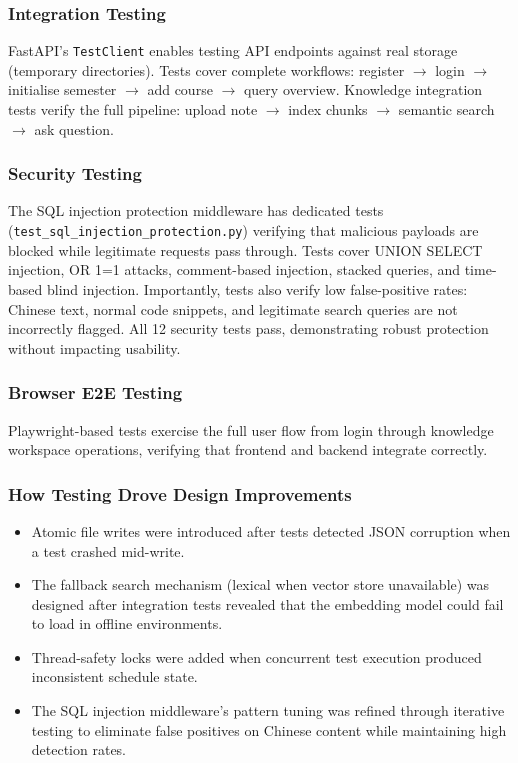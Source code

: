 \documentclass[11pt,a4paper]{article}
\begin{document}
\subsubsection{Integration Testing}
FastAPI's \texttt{TestClient} enables testing API endpoints against real storage (temporary directories). Tests cover complete workflows: register $\rightarrow$ login $\rightarrow$ initialise semester $\rightarrow$ add course $\rightarrow$ query overview. Knowledge integration tests verify the full pipeline: upload note $\rightarrow$ index chunks $\rightarrow$ semantic search $\rightarrow$ ask question.

\subsubsection{Security Testing}
The SQL injection protection middleware has dedicated tests (\texttt{test\_sql\_injection\_protection.py}) verifying that malicious payloads are blocked while legitimate requests pass through. Tests cover UNION SELECT injection, OR 1=1 attacks, comment-based injection, stacked queries, and time-based blind injection. Importantly, tests also verify low false-positive rates: Chinese text, normal code snippets, and legitimate search queries are not incorrectly flagged. All 12 security tests pass, demonstrating robust protection without impacting usability.

\subsubsection{Browser E2E Testing}
Playwright-based tests exercise the full user flow from login through knowledge workspace operations, verifying that frontend and backend integrate correctly.

\subsubsection{How Testing Drove Design Improvements}
\begin{itemize}
    \item Atomic file writes were introduced after tests detected JSON corruption when a test crashed mid-write.
    \item The fallback search mechanism (lexical when vector store unavailable) was designed after integration tests revealed that the embedding model could fail to load in offline environments.
    \item Thread-safety locks were added when concurrent test execution produced inconsistent schedule state.
    \item The SQL injection middleware's pattern tuning was refined through iterative testing to eliminate false positives on Chinese content while maintaining high detection rates.
\end{itemize}
\end{document}
